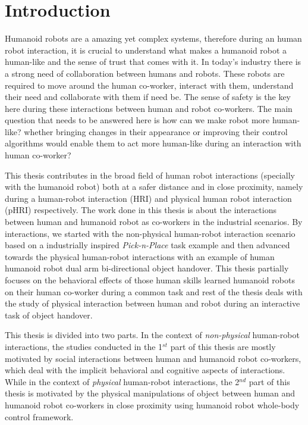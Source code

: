
{\color{blue}\chapter*{Introduction}}
\pagestyle{plain}

Humanoid robots are a amazing yet complex systems, therefore during an human robot interaction, it is crucial to understand what makes a humanoid robot a human-like and the sense of trust that comes with it. In today's industry there is a strong need of collaboration between humans and robots. These robots are required to move around the human co-worker, interact with them, understand their need and collaborate with them if need be. The sense of safety is the key here during these interactions between human and robot co-workers. The main question that needs to be answered here is how can we make robot more human-like? whether bringing changes in their appearance or improving their control algorithms would enable them to act more human-like during an interaction with human co-worker?

This thesis contributes in the broad field of human robot interactions (specially with the humanoid robot) both at a safer distance and in close proximity, namely during a human-robot interaction (HRI) and physical human robot interaction (pHRI) respectively. The work done in this thesis is about the interactions between human and humanoid robot as co-workers in the industrial scenarios. By interactions, we started with the non-physical human-robot interaction scenario based on a industrially inspired \textit{Pick-n-Place} task example and then advanced towards the physical human-robot interactions with an example of human humanoid robot dual arm bi-directional object handover. This thesis partially focuses on the behavioral effects of those human skills learned humanoid robots on their human co-worker during a common task and rest of the thesis deals with the study of physical interaction between human and robot during an interactive task of object handover.

This thesis is divided into two parts. In the context of \textit{non-physical} human-robot interactions, the studies conducted in the 1$^{st}$ part of this thesis are mostly motivated by social interactions between human and humanoid robot co-workers, which deal with the implicit behavioral and cognitive aspects of interactions. While in the context of \textit{physical} human-robot interactions, the 2$^{nd}$ part of this thesis is motivated by the physical manipulations of object between human and humanoid robot co-workers in close proximity using humanoid robot whole-body control framework.


